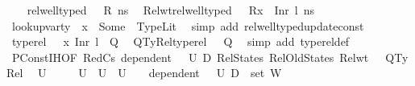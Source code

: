 \begin{isabellebody}
\ \ \isamarkupfalse%
\ {\isacartoucheopen}rel{\isacharunderscore}{\kern0pt}well{\isacharunderscore}{\kern0pt}typed\ {\isasymLambda}\ {\isasymOmega}\ R\ ns{\isacartoucheclose}\ \isamarkupfalse%
\ Rel{\isacharunderscore}{\kern0pt}wt{\isacharcolon}{\kern0pt}{\isachardoublequoteopen}rel{\isacharunderscore}{\kern0pt}well{\isacharunderscore}{\kern0pt}typed\ {\isasymLambda}\ {\isasymOmega}\ {\isacharparenleft}{\kern0pt}R{\isacharparenleft}{\kern0pt}x{}\ {\isasymmapsto}\ Inr\ l{\isacharparenright}{\kern0pt}{\isacharparenright}{\kern0pt}\ {\isacharquery}{\kern0pt}ns{\isacharprime}{\kern0pt}{\isachardoublequoteclose}\isanewline
\ \ \ \ \ \ \ \isamarkupfalse%
\ {\isacartoucheopen}lookup{\isacharunderscore}{\kern0pt}var{\isacharunderscore}{\kern0pt}ty\ {\isasymLambda}\ x{}\ {\isacharequal}{\kern0pt}\ Some\ {\isasymtau}{\isacartoucheclose}\ TypeLit\ \isamarkupfalse%
\ {\isacharparenleft}{\kern0pt}simp\ add{\isacharcolon}{\kern0pt}\ rel{\isacharunderscore}{\kern0pt}well{\isacharunderscore}{\kern0pt}typed{\isacharunderscore}{\kern0pt}update{\isacharunderscore}{\kern0pt}const{\isacharparenright}{\kern0pt}\isanewline
\ \ \isamarkupfalse%
\ {\isacartoucheopen}type{\isacharunderscore}{\kern0pt}rel\ {\isasymLambda}\ {\isasymLambda}{\isacharprime}{\kern0pt}\ {\isacharparenleft}{\kern0pt}{\isacharparenleft}{\kern0pt}x{}{\isacharcomma}{\kern0pt}\ Inr\ l{\isacharparenright}{\kern0pt}\ {\isacharhash}{\kern0pt}\ Q{\isacharparenright}{\kern0pt}{\isacartoucheclose}\ \isamarkupfalse%
\ QTyRel{\isacharcolon}{\kern0pt}{\isachardoublequoteopen}type{\isacharunderscore}{\kern0pt}rel\ {\isasymLambda}\ {\isasymLambda}{\isacharprime}{\kern0pt}\ Q{\isachardoublequoteclose}\ \isamarkupfalse%
\ {\isacharparenleft}{\kern0pt}simp\ add{\isacharcolon}{\kern0pt}\ type{\isacharunderscore}{\kern0pt}rel{\isacharunderscore}{\kern0pt}def{\isacharparenright}{\kern0pt}\isanewline
\ \ \isamarkupfalse%
\ PConst{\isachardot}{\kern0pt}IH{\isacharbrackleft}{\kern0pt}OF\ RedCs{}\ {\isacartoucheopen}dependent\ {\isasymLambda}{\isacharprime}{\kern0pt}\ {\isasymOmega}\ U{}\ D{}{\isacartoucheclose}\ RelStates\ RelOldStates\ Rel{\isacharunderscore}{\kern0pt}wt\ {\isacharunderscore}{\kern0pt}\ {\isacharunderscore}{\kern0pt}\ QTyRel{\isacharbrackright}{\kern0pt}\ \isamarkupfalse%
\ U{}\ \isanewline
\ \ \ \ {\isachardoublequoteopen}U{}\ {\isasymsubseteq}\ U{}{\isachardoublequoteclose}\ \ {\isachardoublequoteopen}U{}\ {\isasymnoteq}\ {\isacharbraceleft}{\kern0pt}{\isacharbraceright}{\kern0pt}{\isachardoublequoteclose}\ \ {\isachardoublequoteopen}dependent\ {\isasymLambda}{\isacharprime}{\kern0pt}\ {\isasymOmega}\ U{}\ {\isacharparenleft}{\kern0pt}D{}\ {\isasymunion}\ set\ W{\isacharparenright}{\kern0pt}{\isachardoublequoteclose}\ \isanewline

\end{isabellebody}

